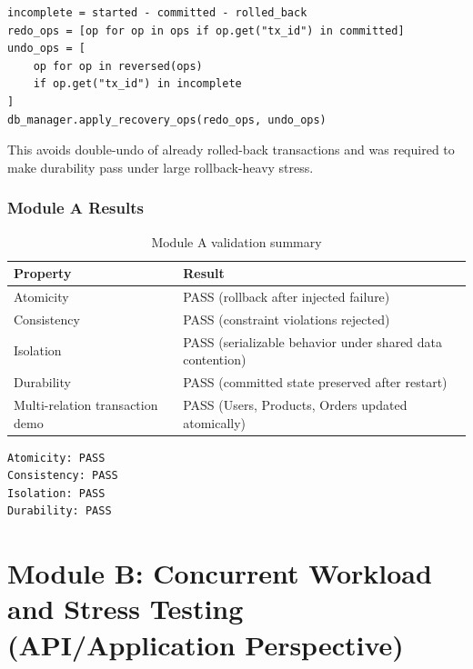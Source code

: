 \documentclass[12pt,a4paper]{article}
\begin{document}
\begin{lstlisting}[style=python, caption={Durability fix: UNDO only incomplete transactions}]
incomplete = started - committed - rolled_back
redo_ops = [op for op in ops if op.get("tx_id") in committed]
undo_ops = [
    op for op in reversed(ops)
    if op.get("tx_id") in incomplete
]
db_manager.apply_recovery_ops(redo_ops, undo_ops)
\end{lstlisting}

This avoids double-undo of already rolled-back transactions and was required to make durability pass under large rollback-heavy stress.

\section{Module A Results}

\begin{table}[H]
\centering
\begin{tabularx}{\textwidth}{lX}
\hline
\textbf{Property} & \textbf{Result} \\
\hline
Atomicity & PASS (rollback after injected failure) \\
Consistency & PASS (constraint violations rejected) \\
Isolation & PASS (serializable behavior under shared data contention) \\
Durability & PASS (committed state preserved after restart) \\
Multi-relation transaction demo & PASS (Users, Products, Orders updated atomically) \\
\hline
\end{tabularx}
\caption{Module A validation summary}
\end{table}

\begin{lstlisting}[style=python, caption={Example ACID check output pattern from Module A tests}]
Atomicity: PASS
Consistency: PASS
Isolation: PASS
Durability: PASS
\end{lstlisting}

\newpage
\part*{Module B: Concurrent Workload and Stress Testing (API/Application Perspective)}
\end{document}
